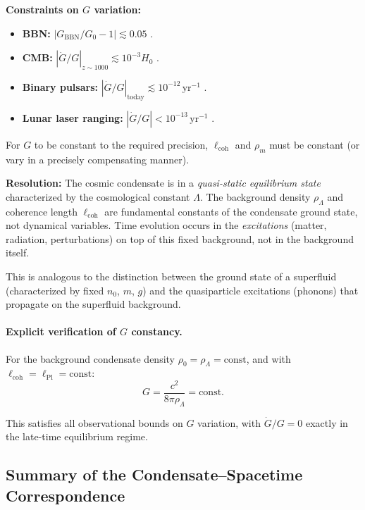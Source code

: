 \textbf{Constraints on $G$ variation:}
\begin{itemize}[leftmargin=1.8em]
    \item \textbf{BBN:} $|G_{\mathrm{BBN}}/G_0 - 1| \lesssim 0.05$ \cite{BBN_Gbounds}.
    \item \textbf{CMB:} $|\dot{G}/G|_{z \sim 1000} \lesssim 10^{-3} H_0$ \cite{Planck2018}.
    \item \textbf{Binary pulsars:} $|\dot{G}/G|_{\mathrm{today}} \lesssim 10^{-12} \, \mathrm{yr}^{-1}$ \cite{HulseTaylor}.
    \item \textbf{Lunar laser ranging:} $|\dot{G}/G| < 10^{-13} \, \mathrm{yr}^{-1}$ \cite{LLR}.
\end{itemize}

For $G$ to be constant to the required precision, $\ell_{\mathrm{coh}}$ and $\rho_m$ must be constant (or vary in a precisely compensating manner).

\textbf{Resolution:} The cosmic condensate is in a \emph{quasi-static equilibrium state} characterized by the cosmological constant $\Lambda$. The background density $\rho_\Lambda$ and coherence length $\ell_{\mathrm{coh}}$ are fundamental constants of the condensate ground state, not dynamical variables. Time evolution occurs in the \emph{excitations} (matter, radiation, perturbations) on top of this fixed background, not in the background itself.

This is analogous to the distinction between the ground state of a superfluid (characterized by fixed $n_0$, $m$, $g$) and the quasiparticle excitations (phonons) that propagate on the superfluid background.

\paragraph{Explicit verification of $G$ constancy.}
For the background condensate density $\rho_0 = \rho_\Lambda = \text{const}$, and with $\ell_{\mathrm{coh}} = \ell_{\mathrm{Pl}} = \text{const}$:
\begin{equation}
G = \frac{c^2}{8\pi \rho_\Lambda} = \text{const}.
\end{equation}

This satisfies all observational bounds on $G$ variation, with $\dot{G}/G = 0$ exactly in the late-time equilibrium regime.

\subsection{Summary of the Condensate--Spacetime Correspondence}
\label{sec:bridge_summary}

